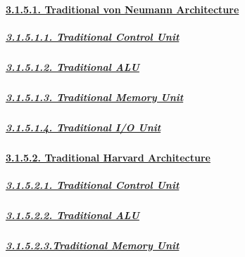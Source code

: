 \documentclass[
]{article}
\begin{document}
\hypertarget{traditional-von-neumann-architecture}{%
\paragraph{\texorpdfstring{\protect\hyperlink{traditional-von-neumann-architecture-1}{3.1.5.1.
Traditional von Neumann
Architecture}}{3.1.5.1. Traditional von Neumann Architecture}}\label{traditional-von-neumann-architecture}}

\hypertarget{traditional-control-unit}{%
\subparagraph{\texorpdfstring{\protect\hyperlink{traditional-control-unit-2}{3.1.5.1.1.
Traditional Control
Unit}}{3.1.5.1.1. Traditional Control Unit}}\label{traditional-control-unit}}

\hypertarget{traditional-alu}{%
\subparagraph{\texorpdfstring{\protect\hyperlink{traditional-alu-2}{3.1.5.1.2.
Traditional ALU}}{3.1.5.1.2. Traditional ALU}}\label{traditional-alu}}

\hypertarget{traditional-memory-unit}{%
\subparagraph{\texorpdfstring{\protect\hyperlink{traditional-memory-unit-2}{3.1.5.1.3.
Traditional Memory
Unit}}{3.1.5.1.3. Traditional Memory Unit}}\label{traditional-memory-unit}}

\hypertarget{traditional-io-unit}{%
\subparagraph{\texorpdfstring{\protect\hyperlink{traditional-io-unit-2}{3.1.5.1.4.
Traditional I/O
Unit}}{3.1.5.1.4. Traditional I/O Unit}}\label{traditional-io-unit}}

\hypertarget{traditional-harvard-architecture}{%
\paragraph{\texorpdfstring{\protect\hyperlink{traditional-harvard-architecture-1}{3.1.5.2.
Traditional Harvard
Architecture}}{3.1.5.2. Traditional Harvard Architecture}}\label{traditional-harvard-architecture}}

\hypertarget{traditional-control-unit-1}{%
\subparagraph{\texorpdfstring{\protect\hyperlink{traditional-control-unit-3}{3.1.5.2.1.
Traditional Control
Unit}}{3.1.5.2.1. Traditional Control Unit}}\label{traditional-control-unit-1}}

\hypertarget{traditional-alu-1}{%
\subparagraph{\texorpdfstring{\protect\hyperlink{traditional-alu-3}{3.1.5.2.2.
Traditional ALU}}{3.1.5.2.2. Traditional ALU}}\label{traditional-alu-1}}

\hypertarget{traditional-memory-unit-1}{%
\subparagraph{\texorpdfstring{\protect\hyperlink{traditional-memory-unit-3}{3.1.5.2.3.Traditional
Memory
Unit}}{3.1.5.2.3.Traditional Memory Unit}}\label{traditional-memory-unit-1}}
\end{document}
